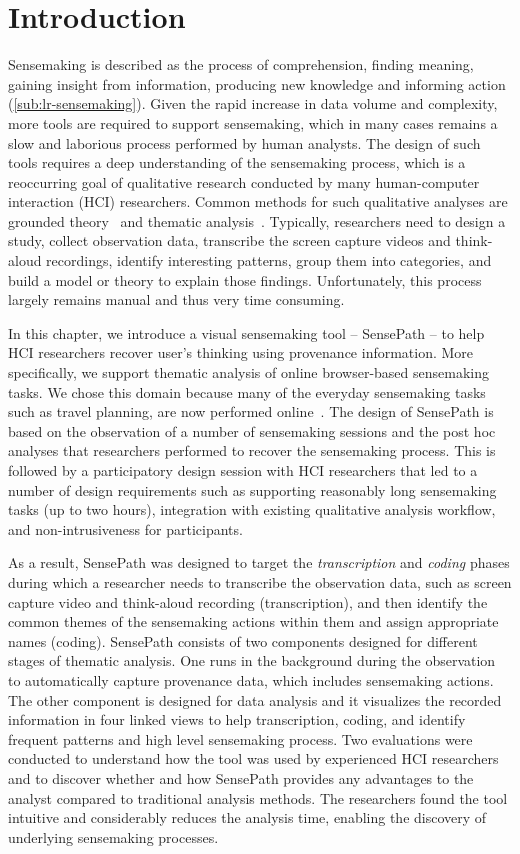 \section{Introduction}
Sensemaking is described as the process of comprehension, finding meaning, gaining insight from information, producing new knowledge and informing action (\autoref{sub:lr-sensemaking}). Given the rapid increase in data volume and complexity, more tools are required to support sensemaking, which in many cases remains a slow and laborious process performed by human analysts. The design of such tools requires a deep understanding of the sensemaking process, which is a reoccurring goal of qualitative research conducted by many human-computer interaction (HCI) researchers. Common methods for such qualitative analyses are grounded theory~\cite{Corbin1994} and thematic analysis~\cite{Guest2011}. Typically, researchers need to design a study, collect observation data, transcribe the screen capture videos and think-aloud recordings, identify interesting patterns, group them into categories, and build a model or theory to explain those findings. Unfortunately, this process largely remains manual and thus very time consuming.

In this chapter, we introduce a visual sensemaking tool -- SensePath -- to help HCI researchers recover user's thinking using provenance information. More specifically, we support thematic analysis of online browser-based sensemaking tasks. We chose this domain because many of the everyday sensemaking tasks such as travel planning, are now performed online~\cite{Russell2008}. The design of SensePath is based on the observation of a number of sensemaking sessions and the post hoc analyses that researchers performed to recover the sensemaking process. This is followed by a participatory design session with HCI researchers that led to a number of design requirements such as supporting reasonably long sensemaking tasks (up to two hours), integration with existing qualitative analysis workflow, and non-intrusiveness for participants.

As a result, SensePath was designed to target the \emph{transcription} and \emph{coding} phases during which a researcher needs to transcribe the observation data, such as screen capture video and think-aloud recording (transcription), and then identify the common themes of the sensemaking actions within them and assign appropriate names (coding). SensePath consists of two components designed for different stages of thematic analysis. One runs in the background during the observation to automatically capture provenance data, which includes sensemaking actions. The other component is designed for data analysis and it visualizes the recorded information in four linked views to help transcription, coding, and identify frequent patterns and high level sensemaking process. Two evaluations were conducted to understand how the tool was used by experienced HCI researchers and to discover whether and how SensePath provides any advantages to the analyst compared to traditional analysis methods. The researchers found the tool intuitive and considerably reduces the analysis time, enabling the discovery of underlying sensemaking processes.

